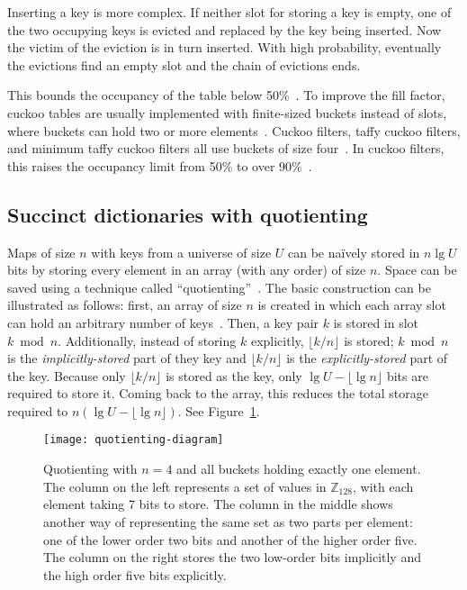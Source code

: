 \documentclass[letterpaper,twocolumn,10pt]{article}
\newcommand{\ints}{\mathbb{Z}}
\begin{document}
Inserting a key is more complex.
If neither slot for storing a key is empty, one of the two occupying keys is evicted and replaced by the key being inserted.
Now the victim of the eviction is in turn inserted.
With high probability, eventually the evictions find an empty slot and the chain of evictions ends.

This bounds the occupancy of the table below 50\%~\cite{cuckoo-journal}.
To improve the fill factor, cuckoo tables are usually implemented with finite-sized buckets instead of slots, where buckets can hold two or more elements~\cite{buckets}.
Cuckoo filters, taffy cuckoo filters, and minimum taffy cuckoo filters all use buckets of size four~\cite{cuckoo}.
In cuckoo filters, this raises the occupancy limit from 50\% to over 90\%~\cite{load-thresholds}.

\subsection{Succinct dictionaries with quotienting}
\label{quotienting}

Maps of size $n$ with keys from a universe of size $U$ can be na\"ively stored in $n \lg U$ bits by storing every element in an array (with any order) of size $n$.
Space can be saved using a technique called ``quotienting''~\cite{knuth,quotient-filter}.
The basic construction can be illustrated as follows:
first, an array of size $n$ is created in which each array slot can hold an arbitrary number of keys~\cite{raman-practical}.
Then, a key pair $k$ is stored in slot $k \bmod n$.
Additionally, instead of storing $k$ explicitly, $\lfloor k / n \rfloor$ is stored;
$k \bmod n$ is the {\em implicitly-stored} part of they key and $\lfloor k / n \rfloor$ is the {\em explicitly-stored} part of the key.
Because only $\lfloor k / n \rfloor$ is stored as the key, only $\lg U - \lfloor \lg n \rfloor$ bits are required to store it.
Coming back to the array, this reduces the total storage required to $n (\lg U - \lfloor \lg n \rfloor)$.
See Figure~\ref{quotienting-figure}.

\begin{figure}
\texttt{[image: quotienting-diagram]}
\caption{\label{quotienting-figure}
Quotienting with $n=4$ and all buckets holding exactly one element.
The column on the left represents a set of values in $\ints_{128}$, with each element taking 7 bits to store.
The column in the middle shows another way of representing the same set as two parts per element: one of the lower order two bits and another of the higher order five.
The column on the right stores the two low-order bits implicitly and the high order five bits explicitly.
}
\end{figure}
\end{document}
